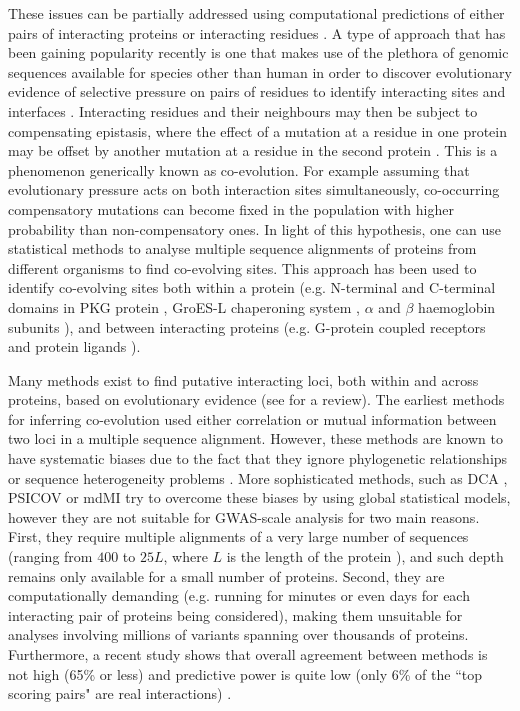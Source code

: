 These issues can be partially addressed using computational predictions of either pairs of interacting proteins or interacting residues \cite{shoemaker2007decipheringP2}. 
A type of approach that has been gaining popularity recently is one that makes use of the plethora of genomic sequences available for species other than human in order to discover evolutionary evidence of selective pressure on pairs of residues to identify interacting sites and interfaces \cite{marks2012protein}. 
Interacting residues and their neighbours may then be subject to compensating epistasis, where the effect of a mutation at a residue in one protein may be offset by another mutation at a residue in the second protein \cite{pazos1997correlated}.
This is a phenomenon generically known as co-evolution. 
For example assuming that evolutionary pressure acts on both interaction sites simultaneously, co-occurring compensatory mutations can become fixed in the population with higher probability than non-compensatory ones. 
In light of this hypothesis, one can use statistical methods to analyse multiple sequence alignments of proteins from different organisms to find co-evolving sites. 
This approach has been used to identify co-evolving sites both within a protein (e.g. N-terminal and C-terminal domains in PKG protein \cite{goh2000co}, GroES-L chaperoning system \cite{ruiz2013coevolution}, $\alpha$ and $\beta$ haemoglobin subunits \cite{pazos1997correlated}), and between interacting proteins (e.g. G-protein coupled receptors and protein ligands \cite{goh2000co}).

Many methods exist to find putative interacting loci, both within and across proteins, based on evolutionary evidence (see \cite{de2013emerging} for a review). 
The earliest methods for inferring co-evolution used either correlation or mutual information between two loci \cite{marks2012protein} in a multiple sequence alignment. 
However, these methods are known to have systematic biases due to the fact that they ignore phylogenetic relationships \cite{de2013emerging} or sequence heterogeneity problems \cite{weigt2009identification}. 
More sophisticated methods, such as DCA \cite{morcos2011direct}, PSICOV \cite{jones2012psicov} or mdMI \cite{clark2014multidimensional} try to overcome these biases by using global statistical models, however they are not suitable for GWAS-scale analysis for two main reasons. 
First, they require multiple alignments of a very large number of sequences (ranging from $400$ to $25L$, where $L$ is the length of the protein \cite{clark2014multidimensional}), and such depth remains only available for a small number of proteins. 
Second, they are computationally demanding (e.g. running for minutes or even days for each interacting pair of proteins being considered), making them unsuitable for analyses involving millions of variants spanning over thousands of proteins. 
Furthermore, a recent study shows that overall agreement between methods is not high (65\% or less) and predictive power is quite low (only 6\% of the ``top scoring pairs" are real interactions) \cite{clark2014multidimensional}.

